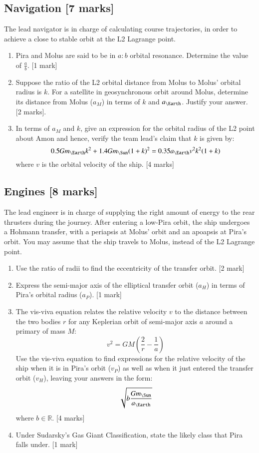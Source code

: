 \documentclass{article}
\begin{document}
\subsection{Navigation [7 marks]}
The lead navigator is in charge of calculating course trajectories, in order to achieve a close to stable orbit at the L2 Lagrange point.
\begin{enumerate}
\item Pira and Molus are said to be in $a:b$ orbital resonance. Determine the value of $\frac{a}{b}$. [1 mark]
\item Suppose the ratio of the L2 orbital distance from Molus to Molus' orbital radius is $k$. For a satellite in geosynchronous orbit around Molus, determine its distance from Molus ($a_M$) in terms of $k$ and $a_\Earth$. Justify your answer. [2 marks].
\item In terms of $a_M$ and $k$, give an expression for the orbital radius of the L2 point about Amon and hence, verify the team lead's claim that $k$ is given by:
\begin{equation}
0.5Gm_\Earth k^2+1.4Gm_\Sun(1+k)^2=0.35a_\Earth v^2k^2(1+k)
\end{equation}
where $v$ is the orbital velocity of the ship. [4 marks]
\end{enumerate}

\subsection{Engines [8 marks]}
The lead engineer is in charge of supplying the right amount of energy to the rear thrusters during the journey. After entering a low-Pira orbit, the ship undergoes a Hohmann transfer, with a periapsis at Molus' orbit and an apoapsis at Pira's orbit. You may assume that the ship travels to Molus, instead of the L2 Lagrange point.
\begin{enumerate}
\item Use the ratio of radii to find the eccentricity of the transfer orbit. [2 mark]
\item Express the semi-major axis of the elliptical transfer orbit ($a_H$) in terms of Pira's orbital radius ($a_P$). [1 mark]
\item The vis-viva equation relates the relative velocity $v$ to the distance between the two bodies $r$ for any Keplerian orbit of semi-major axis $a$ around a primary of mass $M$:
\begin{equation}
v^2=GM(\frac{2}{r}-\frac{1}{a})
\end{equation}
Use the vis-viva equation to find expressions for the relative velocity of the ship when it is in Pira's orbit ($v_P$) as well as when it just entered the transfer orbit ($v_H$), leaving your answers in the form:
\begin{equation}
\sqrt{b\frac{Gm_\Sun}{a_\Earth}}
\end{equation}
where $b \in \mathbb{R}$. [4 marks]
\item Under Sudarsky’s Gas Giant Classification, state the likely class that Pira falls under. [1 mark]
\end{enumerate}
\end{document}
